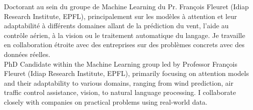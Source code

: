 \commonvspace
\color{deepgray}
\small
\ifFrench
  Doctorant au sein du groupe de Machine Learning du Pr. François Fleuret (Idiap Research Institute, EPFL), principalement sur les modèles à attention et leur adaptabilité à différents domaines allant de la prédiction du vent, l'aide au contrôle aérien, à la vision ou le traitement automatique du langage. Je travaille en collaboration étroite avec des entreprises sur des problèmes concrets avec des données réelles. \\
\else
  PhD Candidate within the Machine Learning group led by Professor François Fleuret (Idiap Research Institute, EPFL), primarily focusing on attention models and their adaptability to various domains, ranging from wind prediction, air traffic control assistance, vision, to natural language processing. I collaborate closely with companies on practical problems using real-world data.\\
\fi
\color{deepgray}